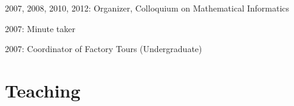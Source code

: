 \documentclass[11pt,letter]{article}
\renewenvironment{itemize}{
  \begin{list}{}{
    \setlength{\leftmargin}{1.5em}
    \setlength{\itemsep}{0.25em}
    \setlength{\parskip}{0pt}
    \setlength{\parsep}{0.25em}
  }
}{
  \end{list}
}
\begin{document}
\begin{itemize}
\item 2007, 2008, 2010, 2012: Organizer, 
Colloquium on Mathematical Informatics

\item 2007: Minute taker

\item 2007: Coordinator of Factory Tours (Undergraduate)

\end{itemize}


\section*{\bf \normalsize Teaching}
%
\end{document}
